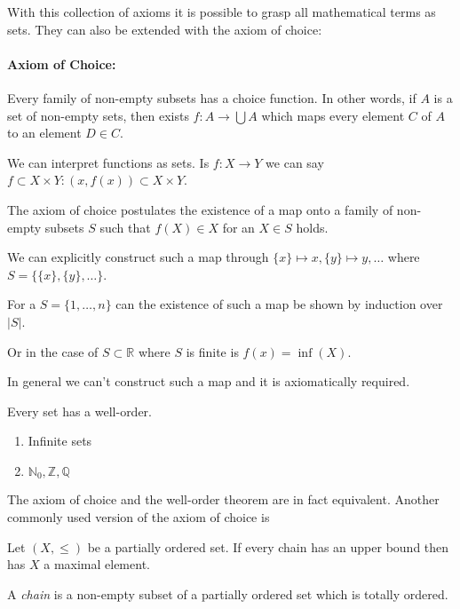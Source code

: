 With this collection of axioms it is possible to grasp all mathematical terms as sets.
They can also be extended with the axiom of choice:

\paragraph{Axiom of Choice:} Every family of non-empty subsets has a choice function.
In other words, if \(A\) is a set of non-empty sets, then exists \(f: A \to \bigcup A\) which maps every element \(C\) of \(A\) to an element \(D \in C\).
\begin{example}
   We can interpret functions as sets.
   Is \(f: X \to Y\) we can say \(f \subset X \times Y: (x, f(x)) \subset X \times Y\).
\end{example}
\begin{example}
   The axiom of choice postulates the existence of a map onto a family of non-empty subsets \(S\) such that \(f(X) \in X\) for an \(X \in S\) holds.

   We can explicitly construct such a map through \(\{x\} \mapsto x, \{y\} \mapsto y, \ldots\) where \(S = \{\{x\}, \{y\}, \ldots\}\).

   For a \(S = \{1, \ldots, n\}\) can the existence of such a map be shown by induction over \(|S|\).

   Or in the case of \(S \subset \mathbb{R}\) where \(S\) is finite is \(f(x) = \inf(X)\).

   In general we can't construct such a map and it is axiomatically required.
\end{example}

\begin{theorem}
   Every set has a well-order.
\end{theorem}
\begin{example}
   \begin{enumerate}
      \item Infinite sets
      \item \(\mathbb{N}_0, \mathbb{Z}, \mathbb{Q}\)
   \end{enumerate}
\end{example}

The axiom of choice and the well-order theorem are in fact equivalent.
Another commonly used version of the axiom of choice is
\begin{theorem}
   Let \((X, \leq)\) be a partially ordered set.
   If every chain has an upper bound then has \(X\) a maximal element.
\end{theorem}
\begin{remark}
   A \emph{chain} is a non-empty subset of a partially ordered set which is totally ordered.
\end{remark}

